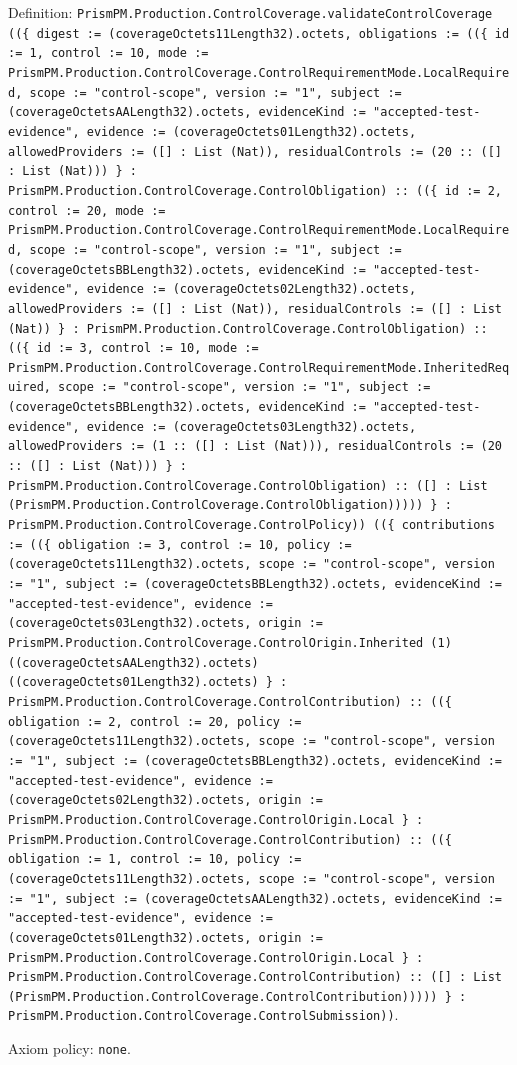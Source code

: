 \documentclass[11pt]{article}
\begin{document}
\noindent Definition: \texttt{PrismPM.Production.ControlCoverage.validateControlCoverage ((\{ digest := (coverageOctets11Length32).octets, obligations := ((\{ id := 1, control := 10, mode := PrismPM.Production.ControlCoverage.ControlRequirementMode.LocalRequired, scope := "control-scope", version := "1", subject := (coverageOctetsAALength32).octets, evidenceKind := "accepted-test-evidence", evidence := (coverageOctets01Length32).octets, allowedProviders := ([] : List (Nat)), residualControls := (20 :: ([] : List (Nat))) \} : PrismPM.Production.ControlCoverage.ControlObligation) :: ((\{ id := 2, control := 20, mode := PrismPM.Production.ControlCoverage.ControlRequirementMode.LocalRequired, scope := "control-scope", version := "1", subject := (coverageOctetsBBLength32).octets, evidenceKind := "accepted-test-evidence", evidence := (coverageOctets02Length32).octets, allowedProviders := ([] : List (Nat)), residualControls := ([] : List (Nat)) \} : PrismPM.Production.ControlCoverage.ControlObligation) :: ((\{ id := 3, control := 10, mode := PrismPM.Production.ControlCoverage.ControlRequirementMode.InheritedRequired, scope := "control-scope", version := "1", subject := (coverageOctetsBBLength32).octets, evidenceKind := "accepted-test-evidence", evidence := (coverageOctets03Length32).octets, allowedProviders := (1 :: ([] : List (Nat))), residualControls := (20 :: ([] : List (Nat))) \} : PrismPM.Production.ControlCoverage.ControlObligation) :: ([] : List (PrismPM.Production.ControlCoverage.ControlObligation))))) \} : PrismPM.Production.ControlCoverage.ControlPolicy)) ((\{ contributions := ((\{ obligation := 3, control := 10, policy := (coverageOctets11Length32).octets, scope := "control-scope", version := "1", subject := (coverageOctetsBBLength32).octets, evidenceKind := "accepted-test-evidence", evidence := (coverageOctets03Length32).octets, origin := PrismPM.Production.ControlCoverage.ControlOrigin.Inherited (1) ((coverageOctetsAALength32).octets) ((coverageOctets01Length32).octets) \} : PrismPM.Production.ControlCoverage.ControlContribution) :: ((\{ obligation := 2, control := 20, policy := (coverageOctets11Length32).octets, scope := "control-scope", version := "1", subject := (coverageOctetsBBLength32).octets, evidenceKind := "accepted-test-evidence", evidence := (coverageOctets02Length32).octets, origin := PrismPM.Production.ControlCoverage.ControlOrigin.Local \} : PrismPM.Production.ControlCoverage.ControlContribution) :: ((\{ obligation := 1, control := 10, policy := (coverageOctets11Length32).octets, scope := "control-scope", version := "1", subject := (coverageOctetsAALength32).octets, evidenceKind := "accepted-test-evidence", evidence := (coverageOctets01Length32).octets, origin := PrismPM.Production.ControlCoverage.ControlOrigin.Local \} : PrismPM.Production.ControlCoverage.ControlContribution) :: ([] : List (PrismPM.Production.ControlCoverage.ControlContribution))))) \} : PrismPM.Production.ControlCoverage.ControlSubmission))}.\par
\noindent Axiom policy: \texttt{none}.\par
\end{document}
